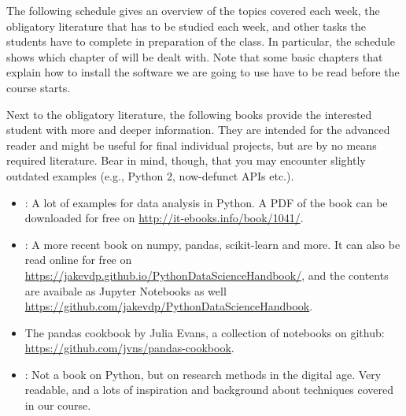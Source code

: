 
The following schedule gives an overview of the topics covered each week, the obligatory literature that has to be studied each week, and other tasks the students have to complete in preparation of the class.
In particular, the schedule shows which chapter of \cite{cssbook} will be dealt with. Note that some basic chapters that explain how to install the software we are going to use have to be read before the course starts.

Next to the obligatory literature, the following books provide the interested student with more and deeper information. They are intended for the advanced reader and might be useful for final individual projects, but are by no means required literature. Bear in mind, though, that you may encounter slightly outdated examples (e.g., Python 2, now-defunct APIs etc.).

\begin{itemize}
\item \citealp{McKinney2012}: A lot of examples for data analysis in Python. A PDF of the book can be downloaded for free on \url{http://it-ebooks.info/book/1041/}.
\item \citealp{VanderPlas2016}: A more recent book on numpy, pandas, scikit-learn and more. It can also be read online for free on \url{https://jakevdp.github.io/PythonDataScienceHandbook/}, and the contents are avaibale as Jupyter Notebooks as well \url{https://github.com/jakevdp/PythonDataScienceHandbook}.
\item The pandas cookbook by Julia Evans, a collection of notebooks on github: \url{https://github.com/jvns/pandas-cookbook}.
\item \citealp{Salganik2017}: Not a book on Python, but on research methods in the digital age. Very readable, and a lots of inspiration and background about techniques covered in our course.
\end{itemize}

